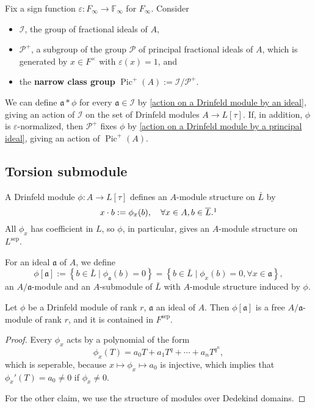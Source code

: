 \documentclass{article}
\newcommand{\F}{\mathbb{F}}
\newcommand{\sep}{\mathrm{sep}}
\DeclareMathOperator{\pic}{Pic}
\begin{document}
Fix a sign function $\varepsilon : F_\infty\to\F_\infty$ for $F_\infty$.
Consider \begin{itemize}
    \item $\mathcal{I}$, the group of fractional ideals of $A$,
    \item $\mathcal{P}^+$, a subgroup of the group $\mathcal{P}$ of principal fractional ideals of $A$, which is generated by $x\in F^\times$ with $\varepsilon(x) = 1$, and
    \item the \textbf{narrow class group} $\pic^+(A) := \mathcal{I}/\mathcal{P}^+$.
\end{itemize}
We can define $\mathfrak{a}*\phi$ for every $\mathfrak{a}\in\mathcal{I}$ by \cref{action on a Drinfeld module by an ideal},
giving an action of $\mathcal{I}$ on the set of Drinfeld modules $A\to L[\tau]$.
If, in addition, $\phi$ is $\varepsilon$-normalized,
then $\mathcal{P}^+$ fixes $\phi$ by \cref{action on a Drinfeld module by a principal ideal},
giving an action of $\pic^+(A)$.

\subsection{Torsion submodule}
A Drinfeld module $\phi : A\to L[\tau]$
defines an $A$-module structure on $\bar L$ by\[x\cdot b := \phi_x(b),\quad\forall x\in A, b\in\bar L.\footnotemark\]
All $\phi_x$ has coefficient in $L$, so $\phi$, in particular, gives an $A$-module structure on $L^\sep$.



For an ideal $\mathfrak{a}$ of $A$,
we define \[\phi[\mathfrak{a}] := \left\{b\in\bar L\mid \phi_\mathfrak{a}(b) = 0\right\} = \left\{ b\in\bar L\mid \phi_x(b) = 0,\forall x\in\mathfrak{a} \right\},\]
an $A/\mathfrak{a}$-module and an $A$-submodule of $\bar L$ with $A$-module structure induced by $\phi$.

\begin{proposition}\label{torsion submodule of an ideal}
    Let $\phi$ be a Drinfeld module of rank $r$,
    $\mathfrak{a}$ an ideal of $A$.
    Then $\phi[\mathfrak{a}]$ is a free $A/\mathfrak{a}$-module of rank $r$,
    and it is contained in $F^\sep$.
\end{proposition}
\begin{proof}
    Every $\phi_x$ acts by a polynomial of the form\[\phi_x(T) = a_0T + a_1T^q + \cdots + a_nT^{q^n},\]
    which is seperable, because $x\mapsto \phi_x\mapsto a_0$ is injective, which implies that $\phi_x'(T) = a_0\ne 0$ if $\phi_x \ne 0$.

    For the other claim, we use the structure of modules over Dedekind domains.
\end{proof}
\end{document}
